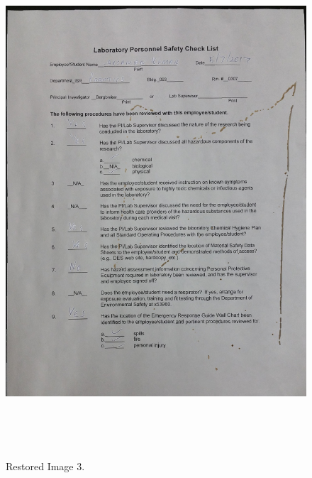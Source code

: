 \begin{figure}[th]
	\centering
	\includegraphics[height=19cm ]{Figures/restored_image3}
	\caption[Restored Image 3]{Restored Image 3.}
	\label{fig:RestoredImage3}
\end{figure}
